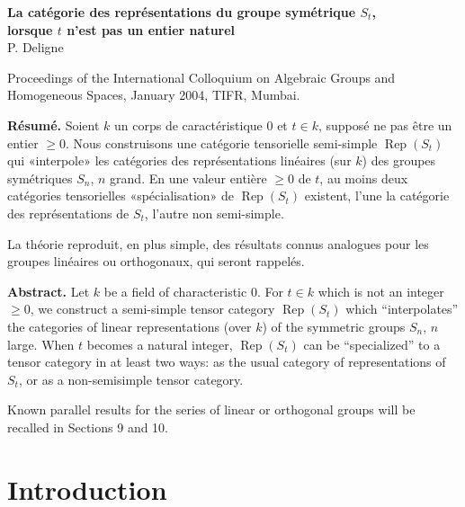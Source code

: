 \documentclass[11pt]{article}
\newcommand{\Rep}{\operatorname{Rep}}
\theoremstyle{deligne}
\begin{document}

\begin{center}
{\Large\bfseries La catégorie des représentations du groupe symétrique \(S_t\),\\
lorsque \(t\) n'est pas un entier naturel}\\[0.5em]
{\large P. Deligne}
\end{center}

\begin{center}
Proceedings of the International Colloquium on Algebraic Groups and Homogeneous Spaces, January 2004, TIFR, Mumbai.
\end{center}

\textbf{Résumé.}
Soient \(k\) un corps de caractéristique \(0\) et \(t\in k\), supposé ne pas être un entier \(\geq 0\). Nous construisons une catégorie tensorielle semi-simple \(\Rep(S_t)\) qui «interpole» les catégories des représentations linéaires (sur \(k\)) des groupes symétriques \(S_n\), \(n\) grand. En une valeur entière \(\geq 0\) de \(t\), au moins deux catégories tensorielles «spécialisation» de \(\Rep(S_t)\) existent, l'une la catégorie des représentations de \(S_t\), l'autre non semi-simple.

La théorie reproduit, en plus simple, des résultats connus analogues pour les groupes linéaires ou orthogonaux, qui seront rappelés.

\textbf{Abstract.}
Let \(k\) be a field of characteristic \(0\). For \(t\in k\) which is not an integer \(\geq0\), we construct a semi-simple tensor category \(\Rep(S_t)\) which ``interpolates'' the categories of linear representations (over \(k\)) of the symmetric groups \(S_n\), \(n\) large. When \(t\) becomes a natural integer, \(\Rep(S_t)\) can be ``specialized'' to a tensor category in at least two ways: as the usual category of representations of \(S_t\), or as a non-semisimple tensor category.

Known parallel results for the series of linear or orthogonal groups will be recalled in Sections 9 and 10.

\section*{Introduction}
\end{document}
